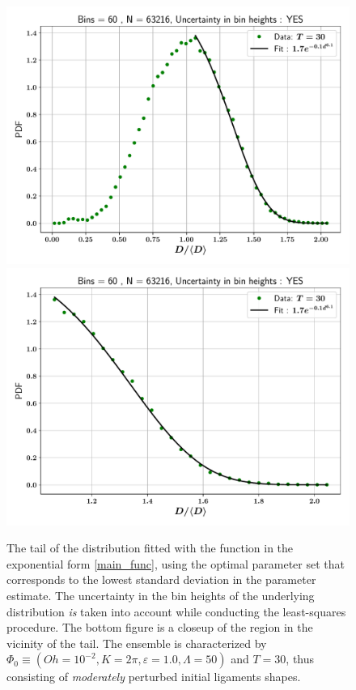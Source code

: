 
\begin{figure}
\centering
\includegraphics{plots/drop_stats/linear_tail_fit_uncertainty_yes.pdf} \\
\includegraphics{plots/drop_stats/linear_zoom_tail_fit_uncertainty_yes.pdf} \\ 
\caption{
	The tail of the distribution fitted with the function 
	in the exponential form \eqref{main_func}, using the optimal parameter
	set that corresponds to the lowest standard deviation in the parameter estimate.
	The uncertainty in the bin heights of the underlying distribution \textit{is} 
	taken into account while conducting the least-squares procedure. 
	The bottom figure is a closeup of the region in the vicinity of the tail.
	The ensemble is characterized by $\Phi_0 \equiv \left( Oh = 10^{-2}, K = 2\pi 
	, \varepsilon = 1.0 , \Lambda = 50 \right)$ and $T = 30$, 
	thus consisting of \textit{moderately} perturbed initial ligaments shapes. 
	}
\label{linear_fits_with}
\end{figure}


